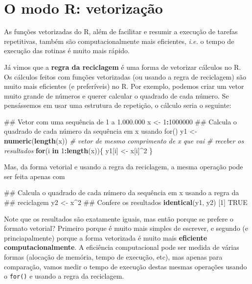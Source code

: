 \documentclass[10pt,a4paper]{book}
\newenvironment{Shaded}{\begin{snugshade}}{\end{snugshade}}
\newcommand{\KeywordTok}[1]{\textcolor[rgb]{0.13,0.29,0.53}{\textbf{#1}}}
\newcommand{\DecValTok}[1]{\textcolor[rgb]{0.00,0.00,0.81}{#1}}
\newcommand{\StringTok}[1]{\textcolor[rgb]{0.31,0.60,0.02}{#1}}
\newcommand{\CommentTok}[1]{\textcolor[rgb]{0.56,0.35,0.01}{\textit{#1}}}
\newcommand{\OtherTok}[1]{\textcolor[rgb]{0.56,0.35,0.01}{#1}}
\newcommand{\ControlFlowTok}[1]{\textcolor[rgb]{0.13,0.29,0.53}{\textbf{#1}}}
\newcommand{\OperatorTok}[1]{\textcolor[rgb]{0.81,0.36,0.00}{\textbf{#1}}}
\newcommand{\NormalTok}[1]{#1}
\begin{document}
\section{O modo R: vetorização}\label{o-modo-r-vetorizacao}

As funções vetorizadas do R, além de facilitar e resumir a execução de
tarefas repetitivas, também são computacionalmente mais eficientes,
\emph{i.e.} o tempo de execução das rotinas é muito mais rápido.

Já vimos que a \textbf{regra da reciclagem} é uma forma de vetorizar
cálculos no R. Os cálculos feitos com funções vetorizadas (ou usando a
regra de reciclagem) são muito mais eficientes (e preferíveis) no R. Por
exemplo, podemos criar um vetor muito grande de números e querer
calcular o quadrado de cada número. Se pensássemos em usar uma estrutura
de repetição, o cálculo seria o seguinte:

\begin{Shaded}
\begin{Highlighting}[]
\NormalTok{## Vetor com uma sequência de 1 a 1.000.000}
\NormalTok{x <-}\StringTok{ }\DecValTok{1}\OperatorTok{:}\DecValTok{1000000}
\NormalTok{## Calcula o quadrado de cada número da sequência em x usando for()}
\NormalTok{y1 <-}\StringTok{ }\KeywordTok{numeric}\NormalTok{(}\KeywordTok{length}\NormalTok{(x)) }\CommentTok{# vetor de mesmo comprimento de x que vai}
                         \CommentTok{# receber os resultados}
\ControlFlowTok{for}\NormalTok{(i }\ControlFlowTok{in} \DecValTok{1}\OperatorTok{:}\KeywordTok{length}\NormalTok{(x))\{}
\NormalTok{    y1[i] <-}\StringTok{ }\NormalTok{x[i]}\OperatorTok{^}\DecValTok{2}
\NormalTok{\}}
\end{Highlighting}
\end{Shaded}

Mas, da forma vetorial e usando a regra da reciclagem, a mesma operação
pode ser feita apenas com

\begin{Shaded}
\begin{Highlighting}[]
\NormalTok{## Calcula o quadrado de cada número da sequência em x usando a regra da}
\NormalTok{## reciclagem}
\NormalTok{y2 <-}\StringTok{ }\NormalTok{x}\OperatorTok{^}\DecValTok{2}
\NormalTok{## Confere os resultados}
\KeywordTok{identical}\NormalTok{(y1, y2)}
\NormalTok{[}\DecValTok{1}\NormalTok{] }\OtherTok{TRUE}
\end{Highlighting}
\end{Shaded}

Note que os resultados são exatamente iguais, mas então porque se
prefere o formato vetorial? Primeiro porque é muito mais simples de
escrever, e segundo (e princiapalmente) porque a forma vetorizada é
muito mais \textbf{eficiente computacionalmente}. A eficiência
computacional pode ser medida de várias formas (alocação de memória,
tempo de execução, etc), mas apenas para comparação, vamos medir o tempo
de execução destas mesmas operações usando o \texttt{for()} e usando a
regra da reciclagem.
\end{document}
